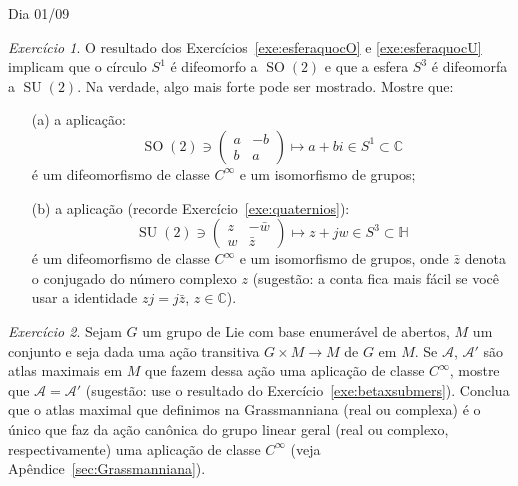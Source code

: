 \documentclass[oneside,11pt]{amsart}
\newcommand{\C}{\mathds C}
\newcommand{\IH}{\mathds H}
\DeclareMathOperator{\SO}{SO}
\DeclareMathOperator{\SU}{SU}
\theoremstyle{remark}\newtheorem{exercise}{Exercício}[section]
\theoremstyle{plain}\newtheorem{teo}{Teorema}[section]
\theoremstyle{plain}\newtheorem{lem}[teo]{Lema}
\theoremstyle{plain}\newtheorem{prop}[teo]{Proposição}
\theoremstyle{definition}\newtheorem{defin}[teo]{Definição}
\theoremstyle{remark}\newtheorem{rem}[teo]{Observação}
\theoremstyle{definition}\newtheorem{example}[teo]{Exemplo}
\numberwithin{equation}{section}
\begin{document}
\begin{section}{Dia 01/09}
\begin{exercise}
O resultado dos Exercícios~\ref{exe:esferaquocO} e \ref{exe:esferaquocU} implicam que o círculo $S^1$ é difeomorfo a $\SO(2)$ e que a esfera $S^3$
é difeomorfa a $\SU(2)$. Na verdade, algo mais forte pode ser mostrado. Mostre que:
\begin{itemize}
\item[(a)] a aplicação:
\[\SO(2)\ni\begin{pmatrix}a&-b\\b&a\end{pmatrix}\longmapsto a+bi\in S^1\subset\C\]
é um difeomorfismo de classe $C^\infty$ e um isomorfismo de grupos;
\item[(b)] a aplicação (recorde Exercício~\ref{exe:quaternios}):
\[\SU(2)\ni\begin{pmatrix}z&-\bar w\\w&\bar z\end{pmatrix}\longmapsto z+jw\in S^3\subset\IH\]
é um difeomorfismo de classe $C^\infty$ e um isomorfismo de grupos, onde $\bar z$ denota o conjugado do número complexo $z$ (sugestão:
a conta fica mais fácil se você usar a identidade $zj=j\bar z$, $z\in\C$).
\end{itemize}
\end{exercise}

\begin{exercise}
Sejam $G$ um grupo de Lie com base enumerável de abertos, $M$ um conjunto e seja dada uma ação transitiva $G\times M\to M$ de $G$ em $M$.
Se $\mathcal A$, $\mathcal A'$ são atlas maximais em $M$ que fazem dessa ação uma aplicação de classe $C^\infty$, mostre que $\mathcal A=\mathcal A'$
(sugestão: use o resultado do Exercício~\ref{exe:betaxsubmers}). Conclua que o atlas maximal que definimos na Grassmanniana (real ou complexa) é o único que
faz da ação canônica do grupo linear geral (real ou complexo, respectivamente)
uma aplicação de classe $C^\infty$ (veja Apêndice~\ref{sec:Grassmanniana}).
\end{exercise}

\end{section}
\end{document}
